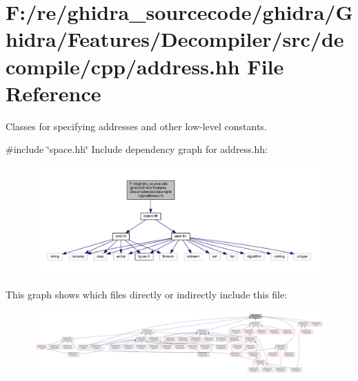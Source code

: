 \hypertarget{address_8hh}{}\section{F\+:/re/ghidra\+\_\+sourcecode/ghidra/\+Ghidra/\+Features/\+Decompiler/src/decompile/cpp/address.hh File Reference}
\label{address_8hh}


Classes for specifying addresses and other low-\/level constants.  


{\ttfamily \#include \char`\"{}space.\+hh\char`\"{}}\newline
Include dependency graph for address.\+hh\+:
\nopagebreak
\begin{figure}[H]
\begin{center}
\leavevmode
\includegraphics[width=350pt]{address_8hh__incl}
\end{center}
\end{figure}
This graph shows which files directly or indirectly include this file\+:
\nopagebreak
\begin{figure}[H]
\begin{center}
\leavevmode
\includegraphics[width=350pt]{address_8hh__dep__incl}
\end{center}
\end{figure}
